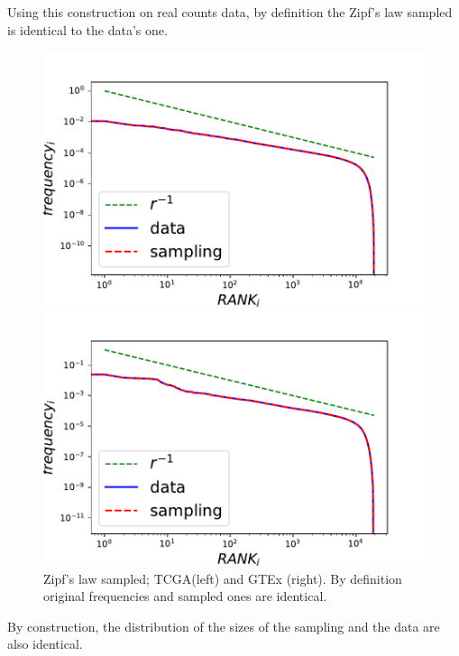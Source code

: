 Using this construction on real counts data, by definition the Zipf's law sampled is identical to the data's one.
\begin{figure}[htb!]
\begin{minipage}{0.5\textwidth}
    \centering
    \includegraphics[width=0.95\linewidth]{pictures/structure/tcga/globalzipf_null.pdf}
\end{minipage}
\hspace{2mm}
\begin{minipage}{0.5\textwidth}
    \centering
    \includegraphics[width=0.95\linewidth]{pictures/structure/gtex/globalzipf_null.pdf}
\end{minipage}
\caption{Zipf's law sampled; TCGA(left) and GTEx (right). By definition original frequencies and sampled ones are identical.}
\label{fig:structure/globalzipf_null}
\end{figure}
By construction, the distribution of the sizes of the sampling and the data are also identical.
